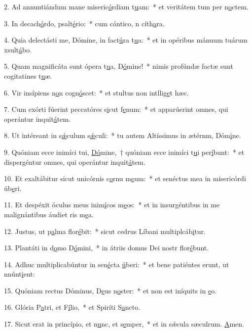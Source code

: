 2. Ad annuntiándum mane miseric\uline{ó}rdiam t\uline{u}am:~* et veritátem tum per n\uline{o}ctem.\par 
3. In decach\uline{ó}rdo, psalt\uline{é}rio:~* cum cántico, n cíth\uline{a}ra.\par 
4. Quia delectásti me, Dómine, in fact\uline{ú}ra t\uline{u}a:~* et in opéribus mánuum tuárum xsult\uline{á}bo.\par 
5. Quam magnificáta sunt ópera t\uline{u}a, D\uline{ó}mine!~* nimis profúndæ factæ sunt cogitatines t\uline{u}æ.\par 
6. Vir insípiens n\uline{o}n cogn\uline{ó}scet:~* et stultus non intllig\uline{e}t hæc.\par 
7. Cum exórti fúerint peccatóres s\uline{i}cut f\uline{e}num:~* et apparúerint omnes, qui operántur inquit\uline{á}tem.\par 
8. Ut intéreant in s\uline{ǽ}culum s\uline{ǽ}culi:~* tu autem Altíssimus in ætérnm, Dóm\uline{i}ne.\par 
9. Quóniam ecce inimíci tui, \uline{Dó}mine,~† quóniam ecce inimíci t\uline{u}i per\uline{í}bunt:~* et dispergéntur omnes, qui operántur inquit\uline{á}tem.\par 
10. Et exaltábitur sicut unicórnis c\uline{o}rnu m\uline{e}um:~* et senéctus mea in misericórdi úb\uline{e}ri.\par 
11. Et despéxit óculus meus inim\uline{í}cos m\uline{e}os:~* et in insurgéntibus in me malignántibus áudiet ris m\uline{e}a.\par 
12. Justus, ut p\uline{a}lma flor\uline{é}bit:~* sicut cedrus Líbani multiplcáb\uline{i}tur.\par 
13. Plantáti in d\uline{o}mo D\uline{ó}mini,~* in átriis domus Dei nostr flor\uline{é}bunt.\par 
14. Adhuc multiplicabúntur in sen\uline{é}cta \uline{ú}beri:~* et bene patiéntes erunt, ut nnúnt\uline{i}ent:\par 
15. Quóniam rectus Dóminus, D\uline{e}us n\uline{o}ster:~* et non est iníquits in \uline{e}o.\par 
16. Glória P\uline{a}tri, et F\uline{í}lio,~* et Spiríti S\uline{a}ncto.\par 
17. Sicut erat in princípio, et n\uline{u}nc, et s\uline{e}mper,~* et in sǽcula sæculrum. \uline{A}men.\par 
